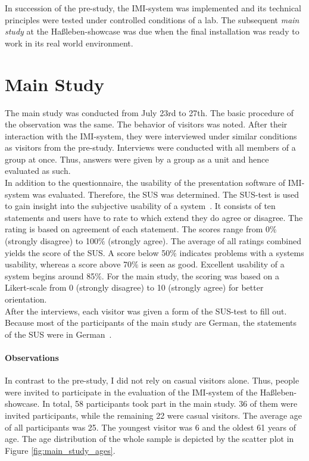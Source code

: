 In succession of the pre-study, the \ac{IMI}-system was implemented and its technical principles were tested under controlled conditions of a lab. The subsequent \textit{main study} at the Haßleben-showcase was due when the final installation was ready to work in its real world environment.


\section{Main Study}
\label{evaluation_study}

The main study was conducted from July 23rd to 27th. The basic procedure of the observation was the same. The behavior of visitors was noted. After their interaction with the \ac{IMI}-system, they were interviewed under similar conditions as visitors from the pre-study. Interviews were conducted with all members of a group at once. Thus, answers were given by a group as a unit and hence evaluated as such. 
\\
In addition to the questionnaire, the usability of the presentation software of \ac{IMI}-system was evaluated. Therefore, the \ac{SUS} was determined. The \ac{SUS}-test is used to gain insight into the subjective usability of a system~\cite{SUStest}. It consists of ten statements and users have to rate to which extend they do agree or disagree. The rating is based on agreement of each statement. The scores range from 0$\%$ (strongly disagree) to 100$\%$ (strongly agree). The average of all ratings combined yields the score of the \ac{SUS}. A score below 50$\%$ indicates problems with a systems usability, whereas a score above 70$\%$ is seen as good. Excellent usability of a system begins around 85$\%$. For the main study, the scoring was based on a Likert-scale from 0 (strongly disagree) to 10 (strongly agree) for better orientation.
\\
After the interviews, each visitor was given a form of the \ac{SUS}-test to fill out. Because most of the participants of the main study are German, the statements of the \ac{SUS} were in German~\cite{SUSdeu}.
 
\paragraph{Observations} In contrast to the pre-study, I did not rely on casual visitors alone. Thus, people were invited to participate in the evaluation of the \ac{IMI}-system of the Haßleben-showcase. In total, 58 participants took part in the main study. 36 of them were invited participants, while the remaining 22 were casual visitors. The average age of all participants was 25. The youngest visitor was 6 and the oldest 61 years of age. The age distribution of the whole sample is depicted by the scatter plot in Figure \ref{fig:main_study_ages}. 

